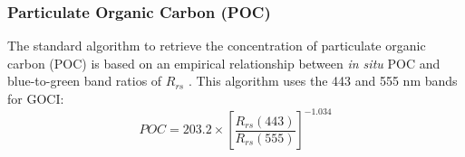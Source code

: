 \documentclass[onecolumn,3p,letterpaper,11pt]{elsarticle}
\begin{document}
\subsubsection{Particulate Organic Carbon (POC)}
The standard algorithm to retrieve the concentration of particulate organic carbon (POC) is based on an empirical relationship between {\it in situ} POC and blue-to-green band ratios of $R_{rs}$ \citep{Stramski2008}. This algorithm uses the 443 and 555 nm bands for GOCI:
\begin{equation}
  POC = 203.2\times \left[\frac{R_{rs}(443)}{R_{rs}(555)} \right]^{-1.034}
\end{equation}


    


\end{document}
